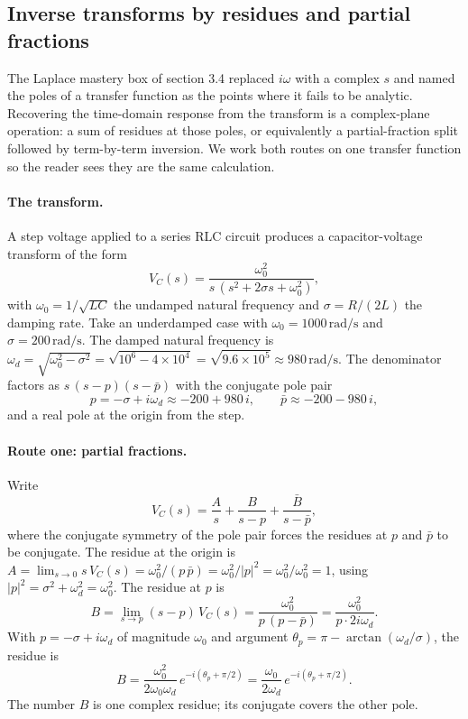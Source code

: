 

\subsection{Inverse transforms by residues and partial fractions}

The Laplace mastery box of section 3.4 replaced $i\omega$ with a complex
$s$ and named the poles of a transfer function as the points where it
fails to be analytic. Recovering the time-domain response from the
transform is a complex-plane operation: a sum of residues at those poles,
or equivalently a partial-fraction split followed by term-by-term
inversion. We work both routes on one transfer function so the reader
sees they are the same calculation.

\paragraph{The transform.} A step voltage applied to a series RLC circuit
produces a capacitor-voltage transform of the form
\[
V_{C}(s) = \frac{\omega_{0}^{2}}{s\,(s^{2} + 2\sigma s + \omega_{0}^{2})},
\]
with $\omega_{0} = 1/\sqrt{LC}$ the undamped natural frequency and
$\sigma = R/(2L)$ the damping rate. Take an underdamped case with
$\omega_{0} = 1000\,\si{\radian\per\second}$ and $\sigma = 200\,\si
{\radian\per\second}$. The damped natural frequency is $\omega_{d} =
\sqrt{\omega_{0}^{2} - \sigma^{2}} = \sqrt{10^{6} - 4 \times 10^{4}} =
\sqrt{9.6 \times 10^{5}} \approx 980\,\si{\radian\per\second}$. The
denominator factors as $s\,(s - p)(s - \bar p)$ with the conjugate pole
pair
\[
p = -\sigma + i\omega_{d} \approx -200 + 980\,i, \qquad
\bar p \approx -200 - 980\,i,
\]
and a real pole at the origin from the step.

\paragraph{Route one: partial fractions.} Write
\[
V_{C}(s) = \frac{A}{s} + \frac{B}{s - p} + \frac{\bar B}{s - \bar p},
\]
where the conjugate symmetry of the pole pair forces the residues at $p$
and $\bar p$ to be conjugate. The residue at the origin is $A = \lim_{s
\to 0} s\,V_{C}(s) = \omega_{0}^{2}/(p\,\bar p) = \omega_{0}^{2}/
|p|^{2} = \omega_{0}^{2}/\omega_{0}^{2} = 1$, using $|p|^{2} = \sigma^{2}
+ \omega_{d}^{2} = \omega_{0}^{2}$. The residue at $p$ is
\[
B = \lim_{s \to p}(s - p)\,V_{C}(s)
= \frac{\omega_{0}^{2}}{p\,(p - \bar p)}
= \frac{\omega_{0}^{2}}{p \cdot 2 i\omega_{d}}.
\]
With $p = -\sigma + i\omega_{d}$ of magnitude $\omega_{0}$ and argument
$\theta_{p} = \pi - \arctan(\omega_{d}/\sigma)$, the residue is
\[
B = \frac{\omega_{0}^{2}}{2\omega_{0}\omega_{d}}\,e^{-i(\theta_{p} + \pi/2)}
= \frac{\omega_{0}}{2\omega_{d}}\,e^{-i(\theta_{p} + \pi/2)}.
\]
The number $B$ is one complex residue; its conjugate covers the other
pole.

